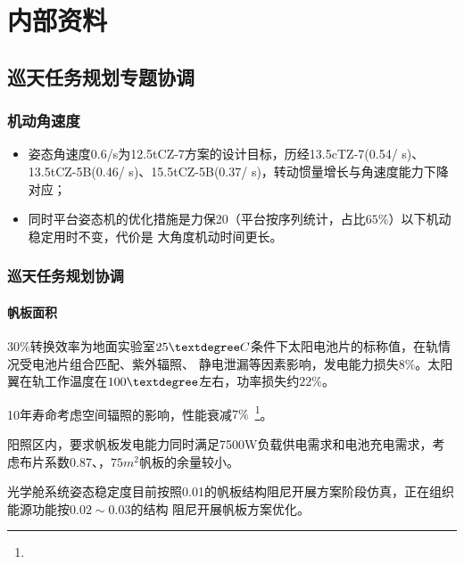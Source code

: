 
\chapter{内部资料}
\label{chap_internal}

\section{巡天任务规划专题协调}
\label{internal_sec_1}

\subsection{机动角速度}
\begin{itemize}
\item[1] 姿态角速度0.6\textdegree/s为12.5tCZ-7方案的设计目标，历经13.5cTZ-7(0.54\textdegree / s)、
13.5tCZ-5B(0.46\textdegree / s)、15.5tCZ-5B(0.37\textdegree / s)，转动惯量增长与角速度能力下降对应；
\item[2] 同时平台姿态机的优化措施是力保20\textdegree（平台按序列统计，占比$65\%$）以下机动稳定用时不变，代价是
大角度机动时间更长。
\end{itemize}
 
\subsection{巡天任务规划协调}
\subsubsection{帆板面积}
$30\%$转换效率为地面实验室$25\textdegree C$条件下太阳电池片的标称值，在轨情况受电池片组合匹配、紫外辐照、
静电泄漏等因素影响，发电能力损失$8\%$。太阳翼在轨工作温度在$100\textdegree$左右，功率损失约$22\%$。

10年寿命考虑空间辐照的影响，性能衰减$7\%$~\footnote{}。

阳照区内，要求帆板发电能力同时满足7500W负载供电需求和电池充电需求，考虑布片系数0.87、，$75m^2$帆板的余量较小。

光学舱系统姿态稳定度目前按照0.01的帆板结构阻尼开展方案阶段仿真，正在组织能源功能按$0.02\sim 0.03$的结构
阻尼开展帆板方案优化。

